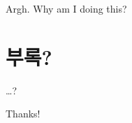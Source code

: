 \documentclass[oneside,phd,]{snuthesis}
\begin{document}
Argh. Why am I doing this? \citet{Nesterov:DoklAkadNaukSssr:1983}
\citep{Boyd:ConvexOptimization:2004}
\citet{Bertsekas:ConvexOptimizationTheory:2009}



\appendix

\chapter{부록?}

\ldots{}?







\begin{abstractalt}

\end{abstractalt}

\acknowledgement
Thanks!
\end{document}
